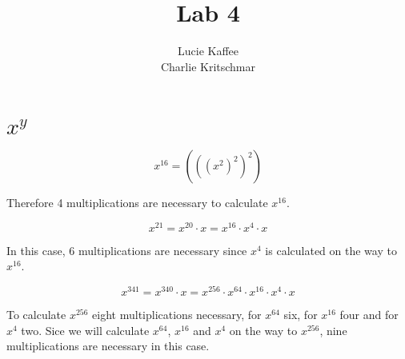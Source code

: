 \documentclass[11pt]{article}
\title{\textbf{Lab 4}}
\author{Lucie Kaffee\\
		Charlie Kritschmar
		}
\date{}
\begin{document}
\maketitle

\section{$x^{y}$}
\begin{equation}
x^{16} = (((x^ {2})^{2})^{2})
\end{equation}

Therefore 4 multiplications are necessary to calculate $x^{16}$.

\begin{equation}
x^{21} = x^ {20} \cdot x = x^{16} \cdot x^{4} \cdot x
\end{equation}

In this case, 6 multiplications are necessary since $x^{4}$ is calculated on the way to $x^{16}$. 

\begin{equation}
x^{341} = x^ {340} \cdot x = x^{256} \cdot x^{64} \cdot x^{16} \cdot x^{4} \cdot x
\end{equation}

To calculate $x^{256}$ eight multiplications necessary, for $x^{64}$ six, for $x^{16}$ four and for $x^{4}$ two. Sice we will calculate $x^{64}$, $x^{16}$ and $x^{4}$ on the way to $x^{256}$, nine multiplications are necessary in this case.
\end{document}
